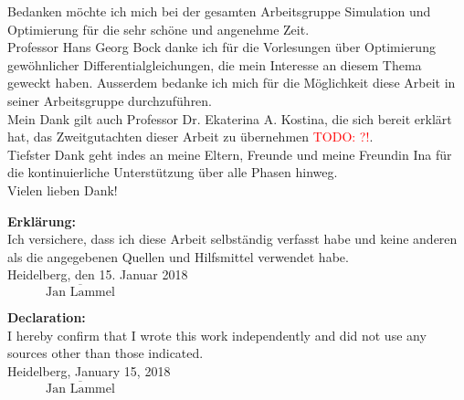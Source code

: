 \documentclass{scrartcl}[12pt, halfparskip]
\numberwithin{equation}{section}
\numberwithin{figure}{section}
\numberwithin{table}{section}
\newcommand{\todo}[1]{\textcolor{red}{TODO: #1}}
\begin{document}
Bedanken möchte ich mich bei der gesamten Arbeitsgruppe Simulation und Optimierung für die sehr schöne und angenehme Zeit. \\

Professor Hans Georg Bock danke ich für die Vorlesungen über Optimierung gewöhnlicher Differentialgleichungen, die mein Interesse an diesem Thema geweckt haben. Ausserdem bedanke ich mich für die Möglichkeit diese Arbeit in seiner Arbeitsgruppe durchzuführen. \\

Mein Dank gilt auch Professor Dr. Ekaterina A. Kostina, die sich bereit erklärt hat, das Zweitgutachten dieser Arbeit zu übernehmen \todo{?!}. \\  

Tiefster Dank geht indes an meine Eltern, Freunde und meine Freundin Ina für die kontinuierliche Unterstützung über alle Phasen hinweg. \\

Vielen lieben Dank!


\newpage
\textbf{Erklärung:} \\[3ex]
Ich versichere, dass ich diese Arbeit selbständig verfasst habe und keine anderen als die angegebenen Quellen und Hilfsmittel verwendet habe.\\[2ex]

Heidelberg, den 15. Januar 2018 \\[6ex]

$\overline{\qquad \quad \text{Jan Lammel} \quad \qquad}$


\vspace{5cm}

\textbf{Declaration:} \\[3ex]
I hereby confirm that I wrote this work independently and did not use any sources other than those indicated.\\[2ex]

Heidelberg, January 15, 2018 \\[6ex]

$\overline{\qquad \quad \text{Jan Lammel} \quad \qquad}$
\end{document}
